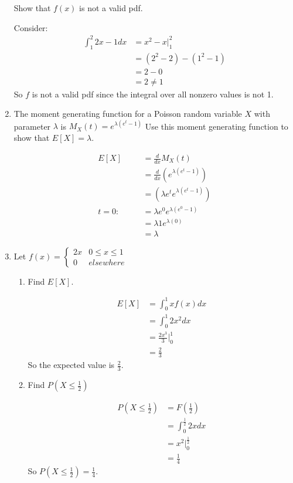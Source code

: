 \documentclass[]{article}
\begin{document}
\begin{enumerate}
Show that $f(x)$ is not a valid pdf.

Consider: 
\begin{align*} 
\int_{1}^{2}2x-1 dx&=x^2-x|^{2}_{1}\\
&=(2^2-2)-(1^2-1)\\
&=2-0\\
&=2\neq1
\end{align*}
So $f$ is not a valid pdf since the integral over all nonzero values is not 1.
\item The moment generating function for a Poisson random variable $X$ with parameter $\lambda$ is $M_X(t) = e^{\lambda(e^t-1)}$
Use this moment generating function to show that $E[X] =\lambda $.

\begin{align*}
    E[X]&=\frac{d}{dx}M_X(t)\\
    &=\frac{d}{dx}(e^{\lambda(e^t-1)})\\
    &=(\lambda e^t e^{\lambda(e^t-1)})\\
    t=0:\quad\quad&=\lambda e^0 e^{\lambda(e^0-1)}\\
    &=\lambda 1 e^{\lambda(0)}\\
    &=\lambda
\end{align*}
\item Let $f(x) = \begin{cases} 
2x & 0 \leq x \leq 1\\
0 & elsewhere
\end{cases}$ 
\begin{enumerate}[label= (\alph*)] 
\item Find $E[X]$.

\begin{align*} 
    E[X]&=\int_{0}^{1}xf(x)dx\\
    &=\int_{0}^{1}2x^2dx\\
    &=\frac{2x^3}{3}|^{1}_{0}\\
    &=\frac{2}{3}
\end{align*}
So the expected value is $\frac{2}{3}$.
\item Find $P(X \leq \frac{1}{2})$

\begin{align*} 
    P(X\leq \frac{1}{2})&=F(\frac{1}{2})\\
    &=\int_{0}^{\frac{1}{2}}2xdx\\
    &=x^2|_0^\frac{1}{2}\\
    &=\frac{1}{4}
\end{align*}
So $P(X\leq\frac{1}{2})=\frac{1}{4}$.
\end{enumerate}


\end{enumerate}
\end{document}
